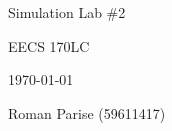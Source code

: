 \centering
\vspace*{5cm}
{\huge Simulation Lab \#2 \par}
{\Large EECS 170LC \par}
{\Large \today \par}
\vspace{1cm}
{\large Roman Parise (59611417) \par}
\vspace{1cm}

